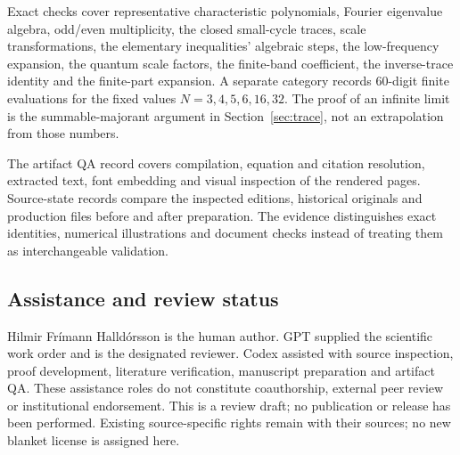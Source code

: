 \documentclass[11pt,a4paper]{article}
\theoremstyle{definition}\newtheorem{definition}[theorem]{Definition}
\theoremstyle{remark}\newtheorem{remark}[theorem]{Remark}
\numberwithin{equation}{section}
\begin{document}
Exact checks cover representative characteristic polynomials,
Fourier eigenvalue algebra, odd/even multiplicity, the closed small-cycle
traces, scale transformations, the elementary inequalities' algebraic
steps, the low-frequency expansion, the quantum scale factors,
the finite-band coefficient, the inverse-trace identity and the
finite-part expansion. A separate category records 60-digit finite
evaluations for the fixed values \(N=3,4,5,6,16,32\).
The proof of an infinite limit is the summable-majorant argument in
Section~\ref{sec:trace}, not an extrapolation from those numbers.

The artifact QA record covers compilation, equation and citation
resolution, extracted text, font embedding and visual inspection of
the rendered pages. Source-state records compare the inspected editions,
historical originals and production files before and after preparation.
The evidence distinguishes exact identities, numerical illustrations
and document checks instead of treating them as interchangeable
validation.

\subsection*{Assistance and review status}
Hilmir Fr\'imann Halld\'orsson is the human author.
GPT supplied the scientific work order and is the designated reviewer.
Codex assisted with source inspection, proof development, literature
verification, manuscript preparation and artifact QA.
These assistance roles do not constitute coauthorship, external peer
review or institutional endorsement. This is a review draft; no publication
or release has been performed. Existing source-specific rights remain
with their sources; no new blanket license is assigned here.
\end{document}
